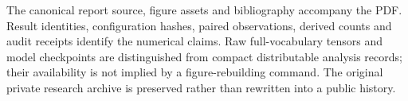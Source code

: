 \documentclass[11pt,letterpaper]{article}
\begin{document}
The canonical report source, figure assets and bibliography accompany the PDF. Result identities, configuration hashes, paired observations, derived counts and audit receipts identify the numerical claims. Raw full-vocabulary tensors and model checkpoints are distinguished from compact distributable analysis records; their availability is not implied by a figure-rebuilding command. The original private research archive is preserved rather than rewritten into a public history.



\end{document}
